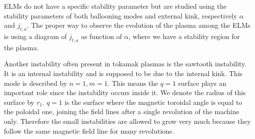 ELMs do not have a specific stability parameter but are studied using the stability parameters of both ballooning modes and external kink, respectively $\alpha$ and $j_{t,a}$. The proper way to observe the evolution of the plasma among the ELMs is using a diagram of $j_{t,a}$ as function of $\alpha$, where we have a stability region for the plasma.

Another instability often present in tokamak plasmas is the sawtooth instability. It is an internal instability and is supposed to be due to the internal kink. This mode is described by $n = 1, m = 1$. This means the $q = 1$ surface plays an important role since the instability occurs inside it. We denote the radius of this surface by $r_1$. $q = 1$ is the surface where the magnetic toroidal angle is equal to the poloidal one, joining the field lines after a single revolution of the machine only. Therefore the small instabilities are allowed to grow very much because they follow the same magnetic field line for many revolutions.

